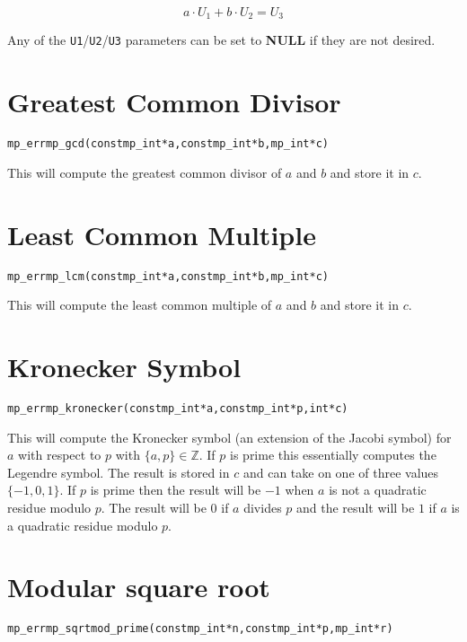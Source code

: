 \documentclass[synpaper]{book}
\begin{document}
\begin{equation}
  a \cdot U_1 + b \cdot U_2 = U_3
\end{equation}

Any of the \texttt{U1}/\texttt{U2}/\texttt{U3} parameters can be set to \textbf{NULL} if they are
not desired.

\section{Greatest Common Divisor}
\begin{alltt}
mp_err mp_gcd (const mp_int *a, const mp_int *b, mp_int *c)
\end{alltt}
This will compute the greatest common divisor of $a$ and $b$ and store it in $c$.

\section{Least Common Multiple}
\begin{alltt}
mp_err mp_lcm (const mp_int *a, const mp_int *b, mp_int *c)
\end{alltt}
This will compute the least common multiple of $a$ and $b$ and store it in $c$.

\section{Kronecker Symbol}
\begin{alltt}
mp_err mp_kronecker (const mp_int *a, const mp_int *p, int *c)
\end{alltt}
This will compute the Kronecker symbol (an extension of the Jacobi symbol) for $a$ with respect to
$p$ with $\lbrace a, p \rbrace \in \mathbb{Z}$.  If $p$ is prime this essentially computes the
Legendre symbol. The result is stored in $c$ and can take on one of three values $\lbrace -1, 0, 1
  \rbrace$.  If $p$ is prime then the result will be $-1$ when $a$ is not a quadratic residue
modulo
$p$.  The result will be $0$ if $a$ divides $p$ and the result will be $1$ if $a$ is a quadratic
residue modulo $p$.

\section{Modular square root}
\begin{alltt}
mp_err mp_sqrtmod_prime(const mp_int *n, const mp_int *p, mp_int *r)
\end{alltt}
\end{document}
